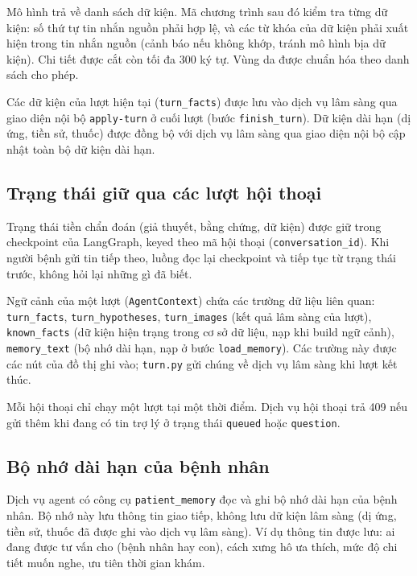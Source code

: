 Mô hình trả về danh sách dữ kiện. Mã chương trình sau đó kiểm tra từng dữ kiện: số thứ tự tin nhắn nguồn phải hợp lệ, và các từ khóa của dữ kiện phải xuất hiện trong tin nhắn nguồn (cảnh báo nếu không khớp, tránh mô hình bịa dữ kiện). Chi tiết được cắt còn tối đa 300 ký tự. Vùng da được chuẩn hóa theo danh sách cho phép.


Các dữ kiện của lượt hiện tại (\texttt{turn\_facts}) được lưu vào dịch vụ lâm sàng qua giao diện nội bộ \texttt{apply-turn} ở cuối lượt (bước \texttt{finish\_turn}). Dữ kiện dài hạn (dị ứng, tiền sử, thuốc) được đồng bộ với dịch vụ lâm sàng qua giao diện nội bộ cập nhật toàn bộ dữ kiện dài hạn.

\subsection{Trạng thái giữ qua các lượt hội thoại}

Trạng thái tiền chẩn đoán (giả thuyết, bằng chứng, dữ kiện) được giữ trong checkpoint của LangGraph, keyed theo mã hội thoại (\texttt{conversation\_id}). Khi người bệnh gửi tin tiếp theo, luồng đọc lại checkpoint và tiếp tục từ trạng thái trước, không hỏi lại những gì đã biết.

Ngữ cảnh của một lượt (\texttt{AgentContext}) chứa các trường dữ liệu liên quan: \texttt{turn\_facts}, \texttt{turn\_hypotheses}, \texttt{turn\_images} (kết quả lâm sàng của lượt), \texttt{known\_facts} (dữ kiện hiện trạng trong cơ sở dữ liệu, nạp khi build ngữ cảnh), \texttt{memory\_text} (bộ nhớ dài hạn, nạp ở bước \texttt{load\_memory}). Các trường này được các nút của đồ thị ghi vào; \texttt{turn.py} gửi chúng về dịch vụ lâm sàng khi lượt kết thúc.

Mỗi hội thoại chỉ chạy một lượt tại một thời điểm. Dịch vụ hội thoại trả 409 nếu gửi thêm khi đang có tin trợ lý ở trạng thái \texttt{queued} hoặc \texttt{question}.

\subsection{Bộ nhớ dài hạn của bệnh nhân}
\label{sec:bo-nho}

Dịch vụ agent có công cụ \texttt{patient\_memory} đọc và ghi bộ nhớ dài hạn của bệnh nhân. Bộ nhớ này lưu thông tin giao tiếp, không lưu dữ kiện lâm sàng (dị ứng, tiền sử, thuốc đã được ghi vào dịch vụ lâm sàng). Ví dụ thông tin được lưu: ai đang được tư vấn cho (bệnh nhân hay con), cách xưng hô ưa thích, mức độ chi tiết muốn nghe, ưu tiên thời gian khám.

